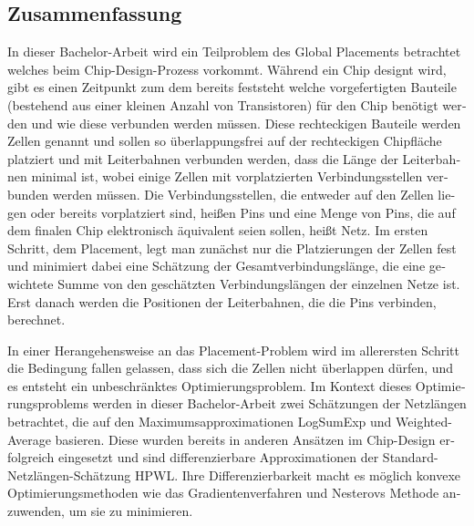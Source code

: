 \begin{otherlanguage}{ngerman}

\chapter{Zusammenfassung} \label{chap:zusammenfassung}

In dieser Bachelor-Arbeit wird ein Teilproblem des Global Placements betrachtet welches beim Chip-Design-Prozess vorkommt.
W\"ahrend ein Chip designt wird, gibt es einen Zeitpunkt zum dem bereits feststeht welche vorgefertigten Bauteile
(bestehend aus einer kleinen Anzahl von Transistoren) f\"ur den Chip ben\"otigt werden und wie diese verbunden werden m\"ussen.
Diese rechteckigen Bauteile werden Zellen genannt und sollen so \"uberlappungsfrei auf der rechteckigen Chipfl\"ache platziert und mit Leiterbahnen verbunden werden,
dass die L\"ange der Leiterbahnen minimal ist, wobei einige Zellen mit vorplatzierten Verbindungsstellen verbunden werden m\"ussen.
Die Verbindungsstellen, die entweder auf den Zellen liegen oder bereits vorplatziert sind, hei\ss{}en Pins
und eine Menge von Pins, die auf dem finalen Chip elektronisch \"aquivalent seien sollen, hei\ss{}t Netz.
Im ersten Schritt, dem Placement, legt man zun\"achst nur die Platzierungen der Zellen fest und minimiert dabei eine Sch\"atzung
der Gesamtverbindungsl\"ange, die eine gewichtete Summe von den gesch\"atzten Verbindungsl\"angen der einzelnen Netze ist.
Erst danach werden die Positionen der Leiterbahnen, die die Pins verbinden, berechnet.

In einer Herangehensweise an das Placement-Problem wird im allerersten Schritt die Bedingung fallen gelassen,
dass sich die Zellen nicht \"uberlappen d\"urfen, und es entsteht ein unbeschr\"anktes Optimierungsproblem.
Im Kontext dieses Optimierungsproblems werden in dieser Bachelor-Arbeit zwei Sch\"atzungen der Netzl\"angen
betrachtet, die auf den Maximumsapproximationen LogSumExp und Weighted-Average basieren.
Diese wurden bereits in anderen Ans\"atzen im Chip-Design erfolgreich eingesetzt und
sind differenzierbare Approximationen der Standard-Netzl\"angen-Sch\"atzung HPWL.
Ihre Differenzierbarkeit macht es m\"oglich konvexe Optimierungsmethoden wie das Gradientenverfahren und Nesterovs Methode anzuwenden,
um sie zu minimieren.


\end{otherlanguage}
